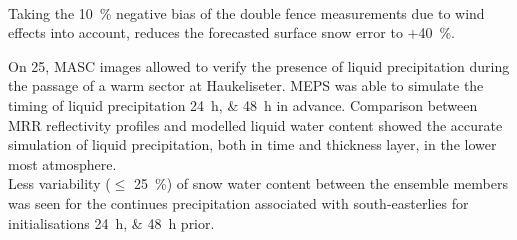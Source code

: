 \\
Taking the \SI{10}{\percent} negative bias of the double fence measurements due to wind effects into account, reduces the forecasted surface snow error to +\SI{40}{\percent}.
\par\medskip
\noindent
On \SI{25}{\dec}, MASC images allowed to verify the presence of liquid precipitation during the passage of a warm sector at Haukeliseter. MEPS was able to simulate the timing of liquid precipitation \SIlist{24;48}{\hour} in advance. %
Comparison between MRR reflectivity profiles and modelled liquid water content showed the accurate simulation of liquid precipitation, both in time and thickness layer, in the lower most atmosphere. %
\\
Less variability ($\le$ \SI{25}{\percent}) of snow water content between the ensemble members was seen for the continues precipitation associated with south-easterlies for initialisations \SIlist{24;48}{\hour} prior.
